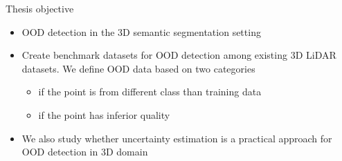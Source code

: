 \documentclass[aspectratio=169]{beamer}
\begin{document}
\begin{frame}{Thesis objective}

\begin{itemize}
    \item OOD detection in the 3D semantic segmentation setting
    \item Create benchmark datasets for OOD detection among existing 3D LiDAR datasets. We define OOD data based on two categories
    \begin{itemize}
        \item if the point is from different class than training data
        \item if the point has inferior quality
    \end{itemize}
    \item We also study whether uncertainty estimation is a practical approach for OOD detection in 3D domain
\end{itemize}
    
\end{frame}
\end{document}
